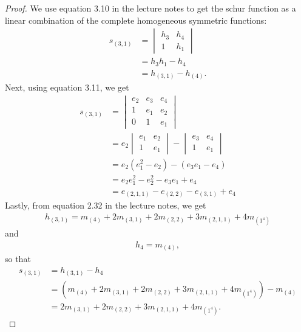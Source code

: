 \documentclass[12pt]{extarticle}
\newcommand{\<}{\langle}
\renewcommand{\>}{\rangle}
\theoremstyle{definition}
\begin{document}
\begin{proof}
  We use equation 3.10 in the lecture notes to get the schur function as a linear combination of the complete homogeneous symmetric functions:
  \begin{align*}
    s_{(3,1)} &
    = 
    \begin{vmatrix}
      h_3 & h_4 \\
      1 & h_1 
    \end{vmatrix} \\
    &=
    h_3h_1 - h_4 \\
    &= h_{(3,1)} - h_{(4)}.
  \end{align*}
  Next, using equation 3.11, we get 
  \begin{align*}
    s_{(3,1)} 
    &= 
    \begin{vmatrix}
      e_2 & e_3 & e_4 \\
      1 & e_1 & e_2 \\
      0 & 1 & e_1
    \end{vmatrix} \\
    &= e_2
    \begin{vmatrix}
      e_1 & e_2 \\
      1 & e_1
    \end{vmatrix}
    -
    \begin{vmatrix}
      e_3 & e_4 \\
      1 & e_1
    \end{vmatrix}
    \\
    &= e_2(e_1^2 - e_2) - (e_3e_1 - e_4) \\
    &= e_2e_1^2 - e_2^2 - e_3e_1 + e_4 \\
    &= e_{(2,1,1)} - e_{(2,2)} - e_{(3,1)} + e_4 
  \end{align*}
  Lastly, from equation 2.32 in the lecture notes, we get
  \begin{align*}
    h_{(3,1)} = m_{(4)} + 2m_{(3,1)} + 2m_{(2,2)} + 3m_{(2,1,1)} + 4m_{(1^4)}
  \end{align*}
  and
  \begin{align*}
    h_4 = m_{(4)},
  \end{align*}
  so that 
  \begin{align*}
    s_{(3,1)} 
    &= h_{(3,1)} - h_4 \\
    &= (m_{(4)} + 2m_{(3,1)} + 2m_{(2,2)} + 3m_{(2,1,1)} + 4m_{(1^4)}) - m_{(4)} \\
    &= 2m_{(3,1)} + 2m_{(2,2)} + 3m_{(2,1,1)} + 4m_{(1^4)}.
  \end{align*}
\end{proof}
\end{document}
